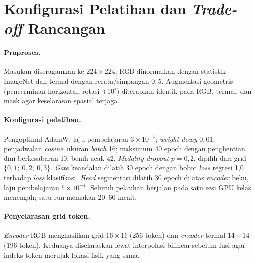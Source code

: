 
\appendix

\section{Konfigurasi Pelatihan dan \emph{Trade-off} Rancangan}
\label{app:konfig}

\paragraph{Praproses.} Masukan diseragamkan ke $224 \times 224$; RGB dinormalkan
dengan statistik ImageNet dan termal dengan rerata/simpangan $0{,}5$. Augmentasi
geometris (pencerminan horizontal, rotasi $\pm 10^\circ$) diterapkan identik pada
RGB, termal, dan mask agar keselarasan spasial terjaga.

\paragraph{Konfigurasi pelatihan.} Pengoptimal AdamW; laju pembelajaran
$3 \times 10^{-4}$; \emph{weight decay} $0{,}01$; penjadwalan \emph{cosine};
ukuran \emph{batch} 16; maksimum 40 epoch dengan penghentian dini berkesabaran
10; benih acak 42. \emph{Modality dropout} $p = 0{,}2$, dipilih dari grid
$\{0{,}1;\ 0{,}2;\ 0{,}3\}$. \emph{Gate} keandalan dilatih 30 epoch dengan bobot
\emph{loss} regresi 1{,}0 terhadap \emph{loss} klasifikasi. \emph{Head}
segmentasi dilatih 30 epoch di atas \emph{encoder} beku, laju pembelajaran
$5 \times 10^{-4}$. Seluruh pelatihan berjalan pada satu sesi GPU kelas
menengah; satu run memakan 20--60 menit.

\paragraph{Penyelarasan grid token.} \emph{Encoder} RGB menghasilkan grid
$16 \times 16$ (256 token) dan \emph{encoder} termal $14 \times 14$ (196 token).
Keduanya diselaraskan lewat interpolasi bilinear sebelum fusi agar indeks token
merujuk lokasi fisik yang sama.

